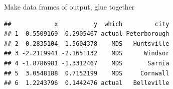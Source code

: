\documentclass[ignorenonframetext,]{beamer}
\newenvironment{Shaded}{\begin{snugshade}}{\end{snugshade}}
\newcommand{\DataTypeTok}[1]{\textcolor[rgb]{0.13,0.29,0.53}{#1}}
\newcommand{\DecValTok}[1]{\textcolor[rgb]{0.00,0.00,0.81}{#1}}
\newcommand{\KeywordTok}[1]{\textcolor[rgb]{0.13,0.29,0.53}{\textbf{#1}}}
\newcommand{\NormalTok}[1]{#1}
\newcommand{\OperatorTok}[1]{\textcolor[rgb]{0.81,0.36,0.00}{\textbf{#1}}}
\newcommand{\StringTok}[1]{\textcolor[rgb]{0.31,0.60,0.02}{#1}}
\begin{document}
\begin{frame}[fragile]{Make data frames of output, glue together}
\begin{Shaded}
\end{Shaded}

\begin{verbatim}
##            x          y  which         city
## 1  0.5509169  0.2905467 actual Peterborough
## 2 -0.2835104  1.5604378    MDS   Huntsville
## 3 -2.2119941 -2.1651132    MDS      Windsor
## 4 -1.8786981 -1.3312467    MDS       Sarnia
## 5  3.0548188  0.7152199    MDS     Cornwall
## 6  1.2243796  0.1442476 actual   Belleville
\end{verbatim}

\normalsize

\end{frame}
\end{document}
